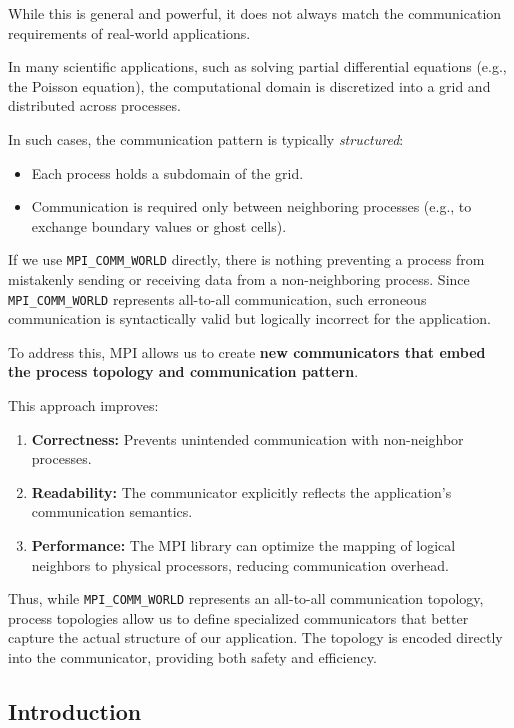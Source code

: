 \documentclass[12pt]{book}
\begin{document}
While this is general and powerful, it does not always match the communication requirements of real-world applications.  

In many scientific applications, such as solving partial differential equations (e.g., the Poisson equation), the computational domain is discretized into a grid and distributed across processes.  

In such cases, the communication pattern is typically \emph{structured}:
\begin{itemize}
    \item Each process holds a subdomain of the grid.
    \item Communication is required only between neighboring processes (e.g., to exchange boundary values or ghost cells).
\end{itemize}

If we use \texttt{MPI\_COMM\_WORLD} directly, there is nothing preventing a process from mistakenly sending or receiving data from a non-neighboring process. Since \texttt{MPI\_COMM\_WORLD} represents all-to-all communication, such erroneous communication is syntactically valid but logically incorrect for the application.  

To address this, MPI allows us to create \textbf{new communicators that embed the process topology and communication pattern}.  

This approach improves:
\begin{enumerate}
    \item \textbf{Correctness:} Prevents unintended communication with non-neighbor processes.
    \item \textbf{Readability:} The communicator explicitly reflects the application's communication semantics.
    \item \textbf{Performance:} The MPI library can optimize the mapping of logical neighbors to physical processors, reducing communication overhead.
\end{enumerate}

Thus, while \texttt{MPI\_COMM\_WORLD} represents an all-to-all communication topology, process topologies allow us to define specialized communicators that better capture the actual structure of our application. The topology is encoded directly into the communicator, providing both safety and efficiency.

\subsection{Introduction}
\end{document}
